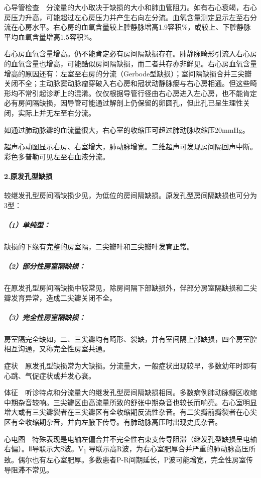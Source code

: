 心导管检查　分流量的大小取决于缺损的大小和肺血管阻力。如有右心衰竭，右心房压力升高，可能超过左心房压力并产生右向左分流。血氧含量测定显示左至右分流在心房水平。右心房的血氧含量较上腔静脉增高1.9容积\%，或较上、下腔静脉平均血氧含量增高1.5容积\%。

右心房血氧含量增高。仍不能肯定必有房间隔缺损存在。肺静脉畸形引流入右心房的血氧含量也增高，可能酷似房间隔缺损，而二者共存亦非鲜见。右心房血氧含量增高的原因还有：左室至右房的分流（Gerbode型缺损）；室间隔缺损合并三尖瓣关闭不全；主动脉窦动脉瘤穿破入右心房和冠状动静脉瘘与右心房相通。但这些畸形均不常引起诊断上的混淆。仅仅根据导管行径由右心房进入左心房，也不能肯定必有房间隔缺损，因导管可能通过解剖上仍保留的卵圆孔，但此孔已呈生理性关闭，实际上并无左至右分流。

如通过肺动脉瓣的血流量很大，右心室的收缩压可超过肺动脉收缩压20mmHg。

超声心动图显示右房、右室增大，肺动脉增宽。二维超声可发现房间隔回声中断。彩色多普勒可见左至右血液分流。

\paragraph{2.原发孔型缺损}

较继发孔型房间隔缺损少见，为低位的房间隔缺损。原发孔型房间隔缺损也可分为3型：

\subparagraph{（1）单纯型：}

缺损的下缘有完整的房室隔，二尖瓣叶和三尖瓣叶发育正常。

\subparagraph{（2）部分性房室隔缺损：}

在原发孔型房间隔缺损中较常见，除房间隔下部缺损外，伴部分房室隔缺损和二尖瓣发育异常，造成二尖瓣关闭不全。

\subparagraph{（3）完全性房室隔缺损：}

房室隔完全缺如，二、三尖瓣均有畸形、裂缺，并有室间隔上部缺损，四个房室腔相互沟通，又称完全性房室共通。

症状　原发孔型缺损常为大缺损。分流量大，一般症状出现较早，多数幼年时即有心跳、气促症状或并发心衰。

体征　听诊特点和分流量大的继发孔型房间隔缺损相同。多数病例肺动脉瓣区收缩中期杂音较响。三尖瓣区由高流量所致的舒张中期杂音也较长而响亮。右心室明显增大或有三尖瓣裂者在三尖瓣区有全收缩期反流性杂音。有二尖瓣前瓣裂者在心尖区有全收缩期杂音，并向左腋下传导。有肺动脉高压时出现史氏杂音。

心电图　特殊表现是电轴左偏合并不完全性右束支传导阻滞（继发孔型缺损呈电轴右偏）。Ⅱ导联示大S波。V\textsubscript{1}
导联示高R波，为右心室肥厚合并严重的肺动脉高压所致。偶尔也有左心室肥厚。多数患者P-R间期延长，P波可能增宽，完全性房室传导阻滞不常见。

